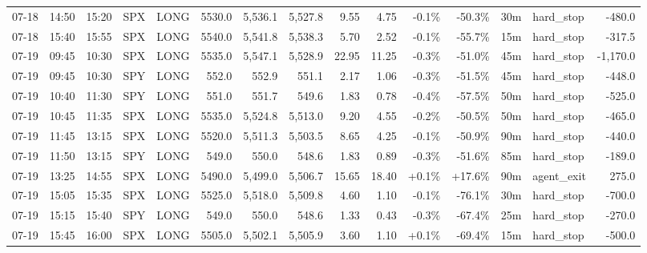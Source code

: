 \documentclass[11pt,a4paper,twoside]{article}
\begin{document}
\begin{landscape}
\begin{center}
\begin{longtable}{>{\color{txtmain}}l l l l l r r r r r r r r >{\color{txtmain}}l r}
07-18 & 14:50 & 15:20 & SPX & LONG & 5530.0 & 5,536.1 & 5,527.8 & 9.55 & 4.75 & \textcolor{lossred}{-0.1\%} & \textcolor{lossred}{-50.3\%} & 30m & hard\_stop & \textcolor{lossred}{-480.0} \\
07-18 & 15:40 & 15:55 & SPX & LONG & 5540.0 & 5,541.8 & 5,538.3 & 5.70 & 2.52 & \textcolor{lossred}{-0.1\%} & \textcolor{lossred}{-55.7\%} & 15m & hard\_stop & \textcolor{lossred}{-317.5} \\
07-19 & 09:45 & 10:30 & SPX & LONG & 5535.0 & 5,547.1 & 5,528.9 & 22.95 & 11.25 & \textcolor{lossred}{-0.3\%} & \textcolor{lossred}{-51.0\%} & 45m & hard\_stop & \textcolor{lossred}{-1,170.0} \\
07-19 & 09:45 & 10:30 & SPY & LONG & 552.0 & 552.9 & 551.1 & 2.17 & 1.06 & \textcolor{lossred}{-0.3\%} & \textcolor{lossred}{-51.5\%} & 45m & hard\_stop & \textcolor{lossred}{-448.0} \\
07-19 & 10:40 & 11:30 & SPY & LONG & 551.0 & 551.7 & 549.6 & 1.83 & 0.78 & \textcolor{lossred}{-0.4\%} & \textcolor{lossred}{-57.5\%} & 50m & hard\_stop & \textcolor{lossred}{-525.0} \\
07-19 & 10:45 & 11:35 & SPX & LONG & 5535.0 & 5,524.8 & 5,513.0 & 9.20 & 4.55 & \textcolor{lossred}{-0.2\%} & \textcolor{lossred}{-50.5\%} & 50m & hard\_stop & \textcolor{lossred}{-465.0} \\
07-19 & 11:45 & 13:15 & SPX & LONG & 5520.0 & 5,511.3 & 5,503.5 & 8.65 & 4.25 & \textcolor{lossred}{-0.1\%} & \textcolor{lossred}{-50.9\%} & 90m & hard\_stop & \textcolor{lossred}{-440.0} \\
07-19 & 11:50 & 13:15 & SPY & LONG & 549.0 & 550.0 & 548.6 & 1.83 & 0.89 & \textcolor{lossred}{-0.3\%} & \textcolor{lossred}{-51.6\%} & 85m & hard\_stop & \textcolor{lossred}{-189.0} \\
07-19 & 13:25 & 14:55 & SPX & LONG & 5490.0 & 5,499.0 & 5,506.7 & 15.65 & 18.40 & \textcolor{wingreen}{+0.1\%} & \textcolor{wingreen}{+17.6\%} & 90m & agent\_exit & \textcolor{wingreen}{275.0} \\
07-19 & 15:05 & 15:35 & SPX & LONG & 5525.0 & 5,518.0 & 5,509.8 & 4.60 & 1.10 & \textcolor{lossred}{-0.1\%} & \textcolor{lossred}{-76.1\%} & 30m & hard\_stop & \textcolor{lossred}{-700.0} \\
07-19 & 15:15 & 15:40 & SPY & LONG & 549.0 & 550.0 & 548.6 & 1.33 & 0.43 & \textcolor{lossred}{-0.3\%} & \textcolor{lossred}{-67.4\%} & 25m & hard\_stop & \textcolor{lossred}{-270.0} \\
07-19 & 15:45 & 16:00 & SPX & LONG & 5505.0 & 5,502.1 & 5,505.9 & 3.60 & 1.10 & \textcolor{wingreen}{+0.1\%} & \textcolor{lossred}{-69.4\%} & 15m & hard\_stop & \textcolor{lossred}{-500.0} \\

\end{longtable}
\end{center}
\end{landscape}
\end{document}
